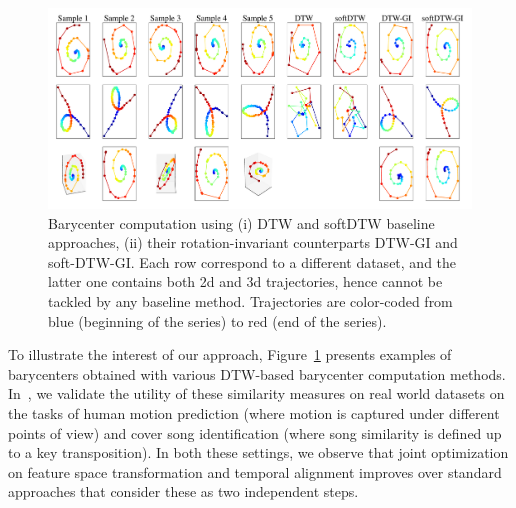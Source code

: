 \begin{figure}[t]
	\centering
	\includegraphics[width=\linewidth]{fig/barycenter_toys_allinone}
	\caption{
		Barycenter computation using (i) DTW and softDTW baseline approaches, (ii) their rotation-invariant counterparts DTW-GI and soft-DTW-GI.
		Each row correspond to a different dataset, and the latter one contains both 2d and 3d trajectories, hence cannot be tackled by any baseline method.
		Trajectories are color-coded from blue (beginning of the series) to red (end of the series).
		\label{fig:dtw_gi_bary}
	}
\end{figure}

To illustrate the interest of our approach,
Figure~\ref{fig:dtw_gi_bary} presents examples of barycenters obtained with
various DTW-based barycenter computation methods.
In~\cite{vayer2020time}, we validate the utility of these similarity measures
on real world
datasets on the tasks of human motion prediction (where motion is captured under
different points of view) and cover song identification (where song similarity
is defined up to a key transposition).
In both these settings, we observe that joint optimization on feature space
transformation and temporal alignment improves over standard approaches that
consider these as two independent steps.
